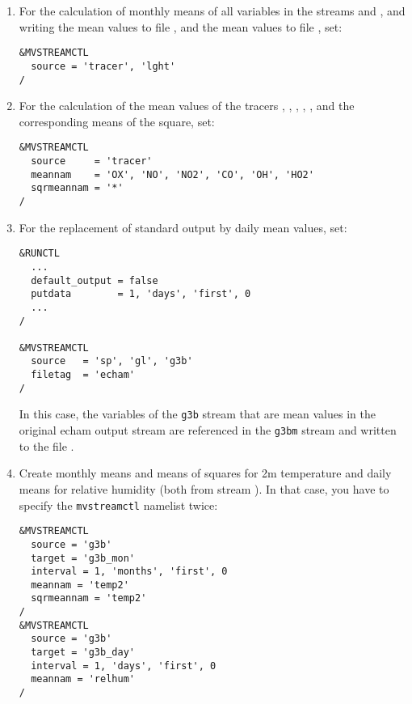 \begin{appendix}
\begin{enumerate}

\item

For the calculation of monthly means of all variables in the streams
 and , and 
writing the  mean values to file ,
and the  mean values to file , set:

\begin{verbatim}
&MVSTREAMCTL
  source = 'tracer', 'lght'
/
\end{verbatim}

\item

For the calculation of the mean values of the tracers
, , , , ,  and
the corresponding means of the square, set:

\begin{verbatim}
&MVSTREAMCTL
  source     = 'tracer'
  meannam    = 'OX', 'NO', 'NO2', 'CO', 'OH', 'HO2'
  sqrmeannam = '*'
/
\end{verbatim}

\item

For the replacement of standard  output by daily mean
values, set:

\begin{verbatim}
&RUNCTL
  ...
  default_output = false
  putdata        = 1, 'days', 'first', 0
  ...
/

&MVSTREAMCTL
  source   = 'sp', 'gl', 'g3b'
  filetag  = 'echam'
/
\end{verbatim}

In this case, the variables of the {\tt g3b} stream that are mean values in the
original echam output stream are referenced in the {\tt g3bm} stream and
written to the file .

\item

Create monthly means and means of squares for 2m temperature
and daily means for relative humidity (both from stream
). In that case, you have to specify the {\tt mvstreamctl}
namelist twice:

\begin{verbatim}
&MVSTREAMCTL
  source = 'g3b'
  target = 'g3b_mon'
  interval = 1, 'months', 'first', 0
  meannam = 'temp2'
  sqrmeannam = 'temp2'
/
&MVSTREAMCTL
  source = 'g3b'
  target = 'g3b_day'
  interval = 1, 'days', 'first', 0
  meannam = 'relhum'
/
\end{verbatim}


\end{enumerate}
\end{appendix}
